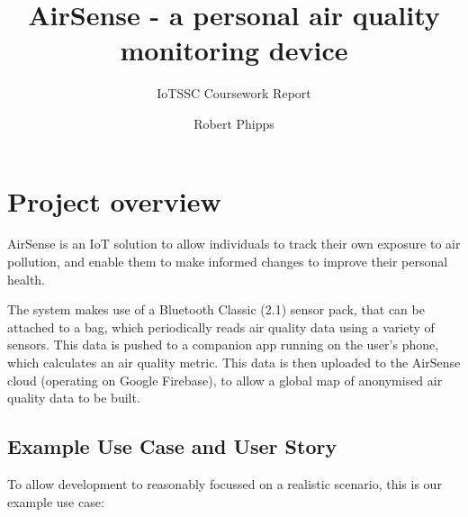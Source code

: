 \documentclass[sigconf, nonacm]{acmart}
\begin{document}
\title{AirSense - a personal air quality monitoring device}
\subtitle{IoTSSC Coursework Report}

\author{Robert Phipps}

\maketitle

\section{Project overview}

AirSense is an IoT solution to allow individuals to track their own exposure to air
pollution, and enable them to make informed changes to improve their personal health.

The system makes use of a Bluetooth Classic (2.1) sensor pack, that can be attached to a bag, 
which periodically reads air quality data using a variety of sensors. This data is pushed to 
a companion app running on the user's phone, which calculates an air quality metric. This
data is then uploaded to the AirSense cloud (operating on Google Firebase), to allow a 
global map of anonymised air quality data to be built.

\subsection{Example Use Case and User Story}

To allow development to reasonably focussed on a realistic scenario, this is our example
use case:
\end{document}
